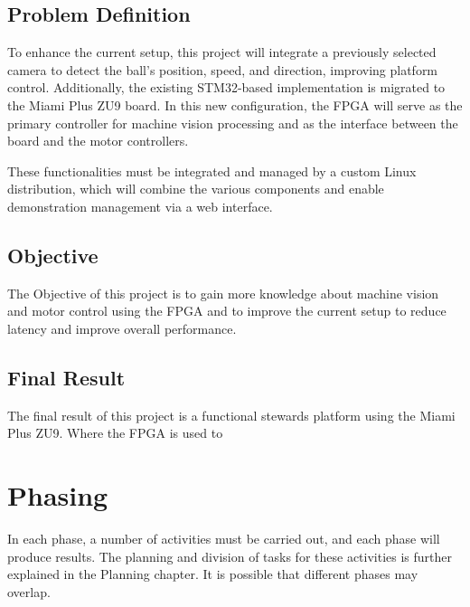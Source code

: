 \documentclass{article}
\begin{document}
\subsection{Problem Definition} 

To enhance the current setup, this project will
integrate a previously selected camera to detect the ball's position, speed, and
direction, improving platform control. Additionally, the existing STM32-based
implementation is migrated to the Miami Plus ZU9 board. In this new
configuration, the FPGA will serve as the primary controller for machine vision
processing and as the interface between the board and the motor controllers.

These functionalities must be integrated and managed by a custom
Linux distribution, which will combine the various components and enable
demonstration management via a web interface.

\subsection{Objective}
The Objective of this project is to gain more knowledge about machine vision and motor control using the FPGA 
and to improve the current setup to reduce latency and improve overall performance.
\subsection{Final Result}
The final result of this project is a functional stewards platform using the Miami Plus ZU9.
Where the FPGA is used to 

\newpage
\section{Phasing}
In each phase, a number of activities must be carried out, and each phase will produce results.
The planning and division of tasks for these activities is further explained in the Planning chapter.
It is possible that different phases may overlap.
\end{document}
